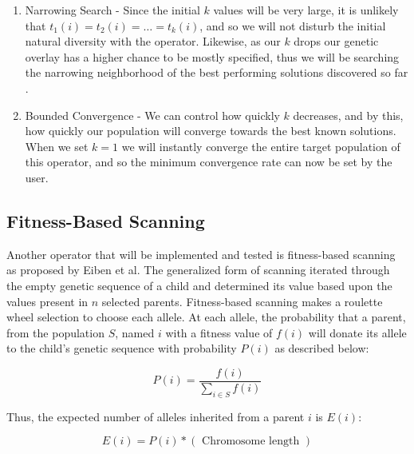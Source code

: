 \begin{enumerate}

\item Narrowing Search - Since the initial $k$ values will be very large, it is unlikely that $t_1(i) = t_2(i) = \ldots = t_k(i)$, and so we will not disturb the initial natural diversity with the operator.  Likewise, as our $k$ drops our genetic overlay has a higher chance to be mostly specified, thus we will be searching the narrowing neighborhood of the best performing solutions discovered so far \cite{Neri11}.

\item Bounded Convergence - We can control how quickly $k$ decreases, and by this, how quickly our population will converge towards the best known solutions. When we set $k=1$ we will instantly converge the entire target population of this operator, and so the minimum convergence rate can now be set by the user.

\end{enumerate}

\subsection*{Fitness-Based Scanning}
Another operator that will be implemented and tested is fitness-based scanning as proposed by Eiben et al\cite{Eiben94}. The generalized form of scanning iterated through the empty genetic sequence of a child and determined its value based upon the values present in $n$ selected parents\cite{Eiben91}. Fitness-based scanning makes a roulette wheel selection to choose each allele. At each allele, the probability that a parent, from the population $S$, named $i$ with a fitness value of $f(i)$ will donate its allele to the child's genetic sequence with probability $P(i)$ as described below\cite{Eiben94}: 

\[ P(i) = \frac{f(i)}{\sum\limits_{i \in S} f(i)} \]

\noindent Thus, the expected number of alleles inherited from a parent $i$ is $E(i)$\cite{Eiben94}:

\[ E(i) = P(i) *(\text{ Chromosome length }) \]

